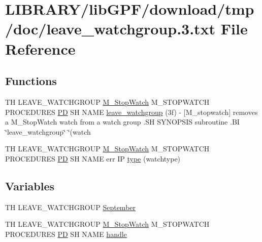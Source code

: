 \hypertarget{leave__watchgroup_83_8txt}{}\section{L\+I\+B\+R\+A\+R\+Y/lib\+G\+P\+F/download/tmp/doc/leave\+\_\+watchgroup.3.txt File Reference}
\label{leave__watchgroup_83_8txt}
\subsection*{Functions}
\begin{DoxyCompactItemize}
\item 
TH L\+E\+A\+V\+E\+\_\+\+W\+A\+T\+C\+H\+G\+R\+O\+UP \hyperlink{option__stopwatch_83_8txt_aa2011fc45a5e502e87ee50996a8a9305}{M\+\_\+\+Stop\+Watch} M\+\_\+\+S\+T\+O\+P\+W\+A\+T\+CH P\+R\+O\+C\+E\+D\+U\+R\+ES \hyperlink{what__overview_81_8txt_a85f26da5a4481fbdb0d9c79f2b94de3e}{PD} SH N\+A\+ME \hyperlink{leave__watchgroup_83_8txt_a430ff35f15204a9a4a68a5ae64e8ff98}{leave\+\_\+watchgroup} (3f) -\/ \mbox{[}\+M\+\_\+stopwatch\mbox{]} removes a M\+\_\+\+Stop\+Watch watch from a watch group .\+S\+H S\+Y\+N\+O\+P\+S\+I\+S subroutine .\+B\+I \char`\"{}leave\+\_\+watchgroup\char`\"{} \char`\"{}(watch
\item 
TH L\+E\+A\+V\+E\+\_\+\+W\+A\+T\+C\+H\+G\+R\+O\+UP \hyperlink{option__stopwatch_83_8txt_aa2011fc45a5e502e87ee50996a8a9305}{M\+\_\+\+Stop\+Watch} M\+\_\+\+S\+T\+O\+P\+W\+A\+T\+CH P\+R\+O\+C\+E\+D\+U\+R\+ES \hyperlink{what__overview_81_8txt_a85f26da5a4481fbdb0d9c79f2b94de3e}{PD} SH N\+A\+ME err IP \hyperlink{leave__watchgroup_83_8txt_afa66a982f4f99718b3217e7853d3d439}{type} (watchtype)
\end{DoxyCompactItemize}
\subsection*{Variables}
\begin{DoxyCompactItemize}
\item 
TH L\+E\+A\+V\+E\+\_\+\+W\+A\+T\+C\+H\+G\+R\+O\+UP \hyperlink{leave__watchgroup_83_8txt_a8e1188b87805533bd2487a085d0d7b3d}{September}
\item 
TH L\+E\+A\+V\+E\+\_\+\+W\+A\+T\+C\+H\+G\+R\+O\+UP \hyperlink{option__stopwatch_83_8txt_aa2011fc45a5e502e87ee50996a8a9305}{M\+\_\+\+Stop\+Watch} M\+\_\+\+S\+T\+O\+P\+W\+A\+T\+CH P\+R\+O\+C\+E\+D\+U\+R\+ES \hyperlink{what__overview_81_8txt_a85f26da5a4481fbdb0d9c79f2b94de3e}{PD} SH N\+A\+ME \hyperlink{leave__watchgroup_83_8txt_ad6c5ebd26f707ef8da754021612a7c8d}{handle}
\end{DoxyCompactItemize}


